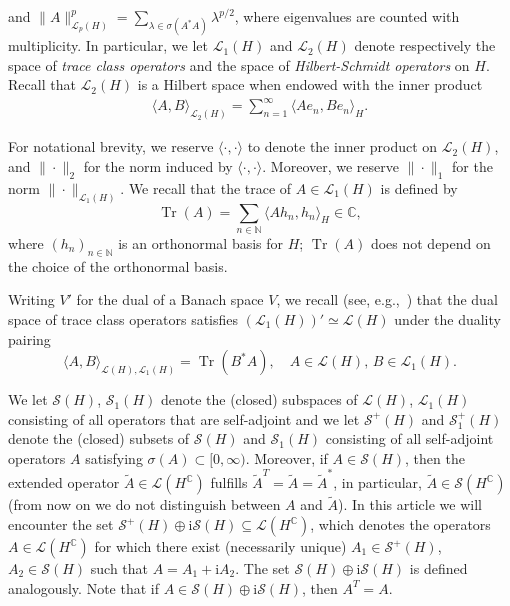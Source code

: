 \documentclass[10pt,a4paper,reqno]{amsart}
\DeclareMathOperator{\tr}{Tr}
\numberwithin{equation}{section}
\theoremstyle{plain}
\theoremstyle{definition}
\theoremstyle{example}
\newcommand{\MN}{\mathbb{N}}
\newcommand{\N}{\MN}
\newcommand{\cL}{\mathcal{L}}
\newcommand{\cS}{\mathcal{S}}
\begin{document}
and $\| A \|_{\cL_p(H)}^{p} = \sum_{\lambda \in \sigma(A^*A)} \lambda^{p/2}$, where eigenvalues are counted with multiplicity.
In particular, we let $\cL_{1}(H)$ and $\cL_{2}(H)$ denote respectively the
space of \emph{trace class operators} and the space of \emph{Hilbert-Schmidt operators} on $H$. Recall 
that $\cL_{2}(H)$ is a Hilbert space when endowed with the inner product
\begin{align*}
 \langle A, B \rangle_{\cL_{2}(H)} = \sum_{n=1}^{\infty} \langle A e_n, B e_n \rangle_H.
\end{align*}

For notational brevity, we reserve $\langle \cdot, \cdot \rangle$ to denote the
inner product on $\cL_{2}(H)$, and $\| \cdot \|_2$ for the norm induced by
$\langle \cdot, \cdot \rangle$. Moreover, we reserve $\| \cdot \|_1$ for the norm $\| \cdot \|_{\cL_{1}(H)}$.
We recall that the trace of $A\in \cL_1(H)$ is defined by
\begin{equation}
 \tr(A) = \sum_{n\in \N} \langle Ah_n, h_n \rangle_{H} \in  \mathbb{C} ,
\end{equation}
where $(h_n)_{n\in \N}$ is an orthonormal basis for $H$; $\tr(A)$ does not depend on the choice of the orthonormal basis. 

Writing $V'$ for the dual of a Banach space $V$, 
we recall (see, e.g.,~\cite[Section 19]{Conway:2000}) that the dual space of trace class operators satisfies $(\cL_1(H))'\simeq \cL(H)$  under the duality pairing
\begin{equation}
 \langle A, B \rangle_{\cL(H),\cL_1(H)}
 = \tr(B^* A),\quad A\in \cL(H),\, B\in \cL_1(H).
\end{equation}

We let $\cS(H)$, $\cS_1(H)$ denote the (closed) subspaces of $\cL(H)$, $\cL_1(H)$ consisting of all operators that are self-adjoint and we let $\cS^+(H)$ and $\cS_1^+(H)$ denote the (closed) subsets of $\cS(H)$ and $\cS_1(H)$ consisting of all self-adjoint operators $A$ satisfying $\sigma(A) \subset [0,\infty)$.
Moreover, if $A\in \cS(H)$, then the extended operator $\tilde{A} \in \cL(H^{\mathbb{C}})$ fulfills $\tilde{A}^T=\tilde{A}=\tilde{A}^*$, in particular, $\tilde{A}\in \cS(H^{\mathbb{C}})$ (from now on we do not distinguish between $A$ and $\tilde{A}$). In this article we will encounter the set $\cS^+(H)\oplus \mathrm{i}\cS(H)\subseteq \cL(H^{\mathbb{C}})$, which
denotes the operators $A\in \cL(H^{\mathbb{C}})$ for which there exist (necessarily unique) $A_1 \in \cS^+(H)$, $A_2\in \cS(H)$ such that $A=A_1 + \mathrm{i} A_2$. The set $\cS(H)\oplus \mathrm{i} \cS(H)$ is defined analogously. Note that if $A\in \cS(H)\oplus \mathrm{i}\cS(H)$, then $A^{T}=A$.
\end{document}

